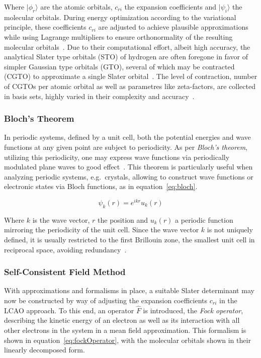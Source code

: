 \documentclass[11pt]{article}
\begin{document}
\bigskip

\noindent Where $|\phi_{r}\rangle$ are the atomic orbitals, $c_{r i}$ the expansion coefficients and $|\psi_i\rangle$ the molecular orbitals.
During energy optimization according to the variational principle, these coefficients $c_{r i}$ are adjusted to achieve plausible approximations while using Lagrange multipliers to ensure orthonormality of the resulting molecular orbitals~\cite{sherrill2000introduction}.
Due to their computational effort, albeit high accuracy, the analytical Slater type orbitals (STO) of hydrogen are often foregone in favor of simpler Gaussian type orbitals (GTO), several of which may be contracted (CGTO) to approximate a single Slater orbital~\cite{Boys1950}. 
The level of contraction, number of CGTOs per atomic orbital as well as parametres like zeta-factors, are collected in basis sets, highly varied in their complexity and accuracy~\cite{Huzinaga1985}.

\subsubsection{Bloch's Theorem}
In periodic systems, defined by a unit cell, both the potential energies and wave functions at any given point are subject to periodicity.
As per \textit{Bloch's theorem}, utilizing this periodicity, one may express wave functions via periodically modulated plane waves to good effect~\cite{Bloch1929}.
This theorem is particularly useful when analyzing periodic systems, e.g.~crystals, allowing to construct wave functions or electronic states via Bloch functions, as in equation~\ref{eq:bloch}.

\begin{equation}
  \psi_{k}(r) = e^{ikr}u_{k}(r)
  \label{eq:bloch}
\end{equation}

\bigskip

\noindent Where $k$ is the wave vector, $r$ the position and $u_{k}(r)$ a periodic function mirroring the periodicity of the unit cell.
Since the wave vector $k$ is not uniquely defined, it is usually restricted to the first Brillouin zone, the smallest unit cell in reciprocal space, avoiding redundancy~\cite{Ashcroft1976-ra}.

\subsubsection{Self-Consistent Field Method}
With approximations and formalisms in place, a suitable Slater determinant may now be constructed by way of adjusting the expansion coefficients $c_{r i}$ in the LCAO approach.
To this end, an operator $\hat{F}$ is introduced, the \textit{Fock operator}, describing the kinetic energy of an electron as well as its interaction with all other electrons in the system in a mean field approximation.
This formalism is shown in equation~\ref{eq:fockOperator}, with the molecular orbitals shown in their linearly decomposed form.
\end{document}
